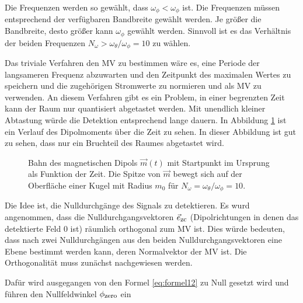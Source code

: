         Die Frequenzen werden so gewählt, dass $\omega_\phi<\omega_\phi$ ist. Die Frequenzen müssen entsprechend der verfügbaren Bandbreite gewählt werden. Je größer die Bandbreite, desto größer kann $\omega_\phi$ gewählt werden. Sinnvoll ist es das Verhältnis der beiden Frequenzen $N_\omega>\omega_\theta / \omega_\phi = 10$ zu wählen.

        Das triviale Verfahren den MV zu bestimmen wäre es, eine Periode der langsameren Frequenz abzuwarten und den Zeitpunkt des maximalen Wertes zu speichern und die zugehörigen Stromwerte zu normieren und als MV zu verwenden. An diesem Verfahren gibt es ein Problem, in einer begrenzten Zeit kann der Raum nur quantisiert abgetastet werden. Mit unendlich kleiner Abtastung würde die Detektion entsprechend lange dauern. In Abbildung \ref{fig:DipoleTrack} ist ein Verlauf des Dipolmoments über die Zeit zu sehen. In dieser Abbildung ist gut zu sehen, dass nur ein Bruchteil des Raumes abgetastet wird.

        \begin{figure}[htb]
            \centering
            \caption{ Bahn des magnetischen Dipols $\vec m (t)$ mit Startpunkt im Ursprung als Funktion der Zeit. Die Spitze von $\vec m$ bewegt sich auf der Oberfläche einer Kugel mit Radius $m_0$ für $N_\omega=\omega_\theta / \omega_\phi = 10$.}
            \label{fig:DipoleTrack}
        \end{figure}
        Die Idee ist, die Nulldurchgänge des Signals zu detektieren. Es wurd angenommen, dass die Nulldurchgangsvektoren $\vec{e}_{\textrm{\footnotesize{zc}}}$ (Dipolrichtungen in denen das detektierte Feld 0 ist) räumlich orthogonal zum MV ist. Dies würde bedeuten, dass nach zwei Nulldurchgängen aus den beiden Nulldurchgangsvektoren eine Ebene bestimmt werden kann, deren Normalvektor der MV ist. Die Orthogonalität muss zunächst nachgewiesen werden.

        Dafür wird ausgegangen von den Formel \ref{eq:formel12} zu Null gesetzt wird und führen den Nullfeldwinkel $\phi_{\textrm{\footnotesize{zero}}}$ ein

